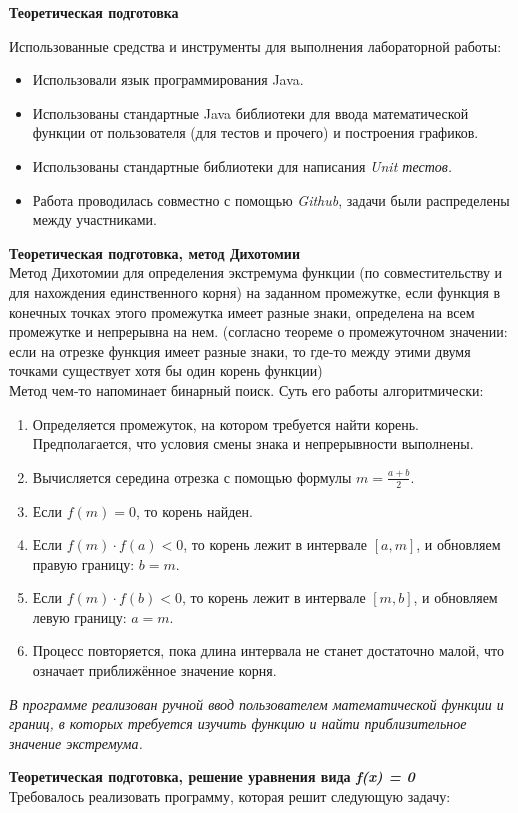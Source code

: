 \textbf{Теоретическая подготовка}
\vspace{0.5cm}

Использованные средства и инструменты для выполнения лабораторной работы:
\begin{itemize}
    \item Использовали язык программирования Java.
    \item Использованы стандартные Java библиотеки для ввода математической функции от пользователя (для тестов и прочего) и построения графиков.
    \item Использованы стандартные библиотеки для написания \textit{Unit тестов.}
    \item Работа проводилась совместно с помощью \textit{Github}, задачи были распределены между участниками.
\end{itemize}
\vspace{1cm}

\textbf{Теоретическая подготовка, метод Дихотомии}\\

Метод Дихотомии для определения экстремума функции (по совместительству и для нахождения единственного корня)
на заданном промежутке, если функция в конечных точках этого промежутка имеет разные знаки, определена на всем промежутке и непрерывна 
на нем. (согласно теореме о промежуточном значении: если на отрезке функция имеет разные знаки, то где-то между
этими двумя точками существует хотя бы один корень функции)\\

Метод чем-то напоминает бинарный поиск. Суть его работы алгоритмически:
\begin{enumerate}
    \item Определяется промежуток, на котором требуется найти корень. Предполагается, что условия смены знака и непрерывности выполнены.
    \item Вычисляется середина отрезка с помощью формулы \( m = \frac{a + b}{2} \). 
    \item Если \( f(m) = 0 \), то корень найден. 
    \item Если \( f(m) \cdot f(a) < 0 \), то корень лежит в интервале \([a, m]\), и обновляем правую границу: \(b = m\).
    \item Если \( f(m) \cdot f(b) < 0 \), то корень лежит в интервале \([m, b]\), и обновляем левую границу: \(a = m\).
    \item Процесс повторяется, пока длина интервала не станет достаточно малой, что означает приближённое значение корня.
\end{enumerate}
\textit{В программе реализован ручной ввод пользователем математической функции и границ, в которых требуется изучить функцию и найти приблизительное значение экстремума.}
\vspace{1cm}

\textbf{Теоретическая подготовка, решение уравнения вида \textit{f(x) = 0}}\\ 
Требовалось реализовать программу, которая решит следующую задачу: 